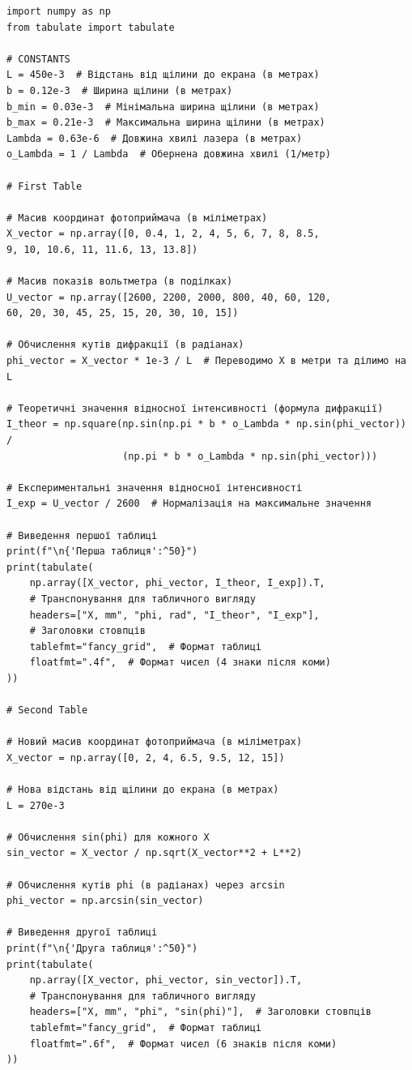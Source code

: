 \documentclass[12pt,a4paper]{article}
\begin{document}
    \small{ 

\begin{verbatim}
import numpy as np
from tabulate import tabulate

# CONSTANTS
L = 450e-3  # Відстань від щілини до екрана (в метрах)
b = 0.12e-3  # Ширина щілини (в метрах)
b_min = 0.03e-3  # Мінімальна ширина щілини (в метрах)
b_max = 0.21e-3  # Максимальна ширина щілини (в метрах)
Lambda = 0.63e-6  # Довжина хвилі лазера (в метрах)
o_Lambda = 1 / Lambda  # Обернена довжина хвилі (1/метр)

# First Table

# Масив координат фотоприймача (в міліметрах)
X_vector = np.array([0, 0.4, 1, 2, 4, 5, 6, 7, 8, 8.5,
9, 10, 10.6, 11, 11.6, 13, 13.8])

# Масив показів вольтметра (в поділках)
U_vector = np.array([2600, 2200, 2000, 800, 40, 60, 120,
60, 20, 30, 45, 25, 15, 20, 30, 10, 15])

# Обчислення кутів дифракції (в радіанах)
phi_vector = X_vector * 1e-3 / L  # Переводимо X в метри та ділимо на L

# Теоретичні значення відносної інтенсивності (формула дифракції)
I_theor = np.square(np.sin(np.pi * b * o_Lambda * np.sin(phi_vector)) / 
                    (np.pi * b * o_Lambda * np.sin(phi_vector)))

# Експериментальні значення відносної інтенсивності
I_exp = U_vector / 2600  # Нормалізація на максимальне значення

# Виведення першої таблиці
print(f"\n{'Перша таблиця':^50}")
print(tabulate(
    np.array([X_vector, phi_vector, I_theor, I_exp]).T, 
    # Транспонування для табличного вигляду
    headers=["X, mm", "phi, rad", "I_theor", "I_exp"], 
    # Заголовки стовпців
    tablefmt="fancy_grid",  # Формат таблиці
    floatfmt=".4f",  # Формат чисел (4 знаки після коми)
))

# Second Table

# Новий масив координат фотоприймача (в міліметрах)
X_vector = np.array([0, 2, 4, 6.5, 9.5, 12, 15])

# Нова відстань від щілини до екрана (в метрах)
L = 270e-3

# Обчислення sin(phi) для кожного X
sin_vector = X_vector / np.sqrt(X_vector**2 + L**2)

# Обчислення кутів phi (в радіанах) через arcsin
phi_vector = np.arcsin(sin_vector)

# Виведення другої таблиці
print(f"\n{'Друга таблиця':^50}")
print(tabulate(
    np.array([X_vector, phi_vector, sin_vector]).T, 
    # Транспонування для табличного вигляду
    headers=["X, mm", "phi", "sin(phi)"],  # Заголовки стовпців
    tablefmt="fancy_grid",  # Формат таблиці
    floatfmt=".6f",  # Формат чисел (6 знаків після коми)
))


\end{verbatim}}
\end{document}
